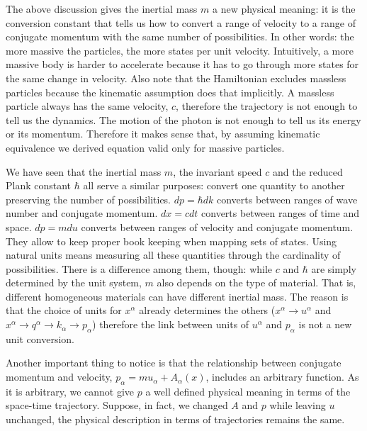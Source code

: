 \documentclass[aps,pra,10pt,twocolumn,floatfix,nofootinbib]{revtex4-1}
\numberwithin{equation}{section}
\theoremstyle{definition}
\begin{document}
The above discussion gives the inertial mass $m$ a new physical meaning: it is the conversion constant that tells us how to convert a range of velocity to a range of conjugate momentum with the same number of possibilities. In other words: the more massive the particles, the more states per unit velocity. Intuitively, a more massive body is harder to accelerate because it has to go through more states for the same change in velocity. Also note that the Hamiltonian excludes massless particles because the kinematic assumption does that implicitly. A massless particle always has the same velocity, $c$, therefore the trajectory is not enough to tell us the dynamics. The motion of the photon is not enough to tell us its energy or its momentum. Therefore it makes sense that, by assuming kinematic equivalence we derived equation valid only for massive particles.

We have seen that the inertial mass $m$, the invariant speed $c$ and the reduced Plank constant $\hbar$ all serve a similar purposes: convert one quantity to another preserving the number of possibilities. $dp=\hbar dk$ converts between ranges of wave number and conjugate momentum. $dx = c dt$ converts between ranges of time and space. $dp = m du$ converts between ranges of velocity and conjugate momentum. They allow to keep proper book keeping when mapping sets of states. Using natural units means measuring all these quantities through the cardinality of possibilities. There is a difference among them, though: while $c$ and $\hbar$ are simply determined by the unit system, $m$ also depends on the type of material. That is, different homogeneous materials can have different inertial mass. The reason is that the choice of units for $x^\alpha$ already determines the others ($x^\alpha \rightarrow u^\alpha$ and $x^\alpha \rightarrow q^\alpha \rightarrow k_\alpha \rightarrow p_\alpha$) therefore the link between units of $u^\alpha$ and $p_\alpha$ is not a new unit conversion.

Another important thing to notice is that the relationship between conjugate momentum and velocity, $p_\alpha = m u_\alpha + A_\alpha(x)$, includes an arbitrary function. As it is arbitrary, we cannot give $p$ a well defined physical meaning in terms of the space-time trajectory. Suppose, in fact, we changed $A$ and $p$ while leaving $u$ unchanged, the physical description in terms of trajectories remains the same.
\end{document}
